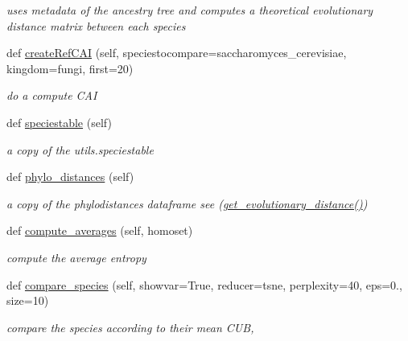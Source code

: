 \begin{DoxyCompactItemize}
\begin{DoxyCompactList}\small\item\em uses metadata of the ancestry tree and computes a theoretical evolutionary distance matrix between each species \end{DoxyCompactList}\item 
def \mbox{\hyperlink{class_py_c_u_b_1_1py_c_u_b_1_1_py_c_u_b_a40a742a1a05fc21c7bced2c75fb93fc6}{create\+Ref\+C\+AI}} (self, speciestocompare=\textquotesingle{}saccharomyces\+\_\+cerevisiae\textquotesingle{}, kingdom=\textquotesingle{}fungi\textquotesingle{}, first=20)
\begin{DoxyCompactList}\small\item\em do a compute C\+AI \end{DoxyCompactList}\item 
def \mbox{\hyperlink{class_py_c_u_b_1_1py_c_u_b_1_1_py_c_u_b_af3e280c265200f13946e4bdcb4cd9dd0}{speciestable}} (self)
\begin{DoxyCompactList}\small\item\em a copy of the utils.\+speciestable \end{DoxyCompactList}\item 
def \mbox{\hyperlink{class_py_c_u_b_1_1py_c_u_b_1_1_py_c_u_b_a2ea40ac1dd5b4ad8847ec12c867d457f}{phylo\+\_\+distances}} (self)
\begin{DoxyCompactList}\small\item\em a copy of the phylodistances dataframe see (\mbox{\hyperlink{class_py_c_u_b_1_1py_c_u_b_1_1_py_c_u_b_af0d7bed125f4437bea6b8051f9922c1d}{get\+\_\+evolutionary\+\_\+distance()}}) \end{DoxyCompactList}\item 
def \mbox{\hyperlink{class_py_c_u_b_1_1py_c_u_b_1_1_py_c_u_b_a9526c0d10381daf5abc8ea120454e701}{compute\+\_\+averages}} (self, homoset)
\begin{DoxyCompactList}\small\item\em compute the average entropy \end{DoxyCompactList}\item 
def \mbox{\hyperlink{class_py_c_u_b_1_1py_c_u_b_1_1_py_c_u_b_ad7f24b316bc8c257719da20c0792ec01}{compare\+\_\+species}} (self, showvar=True, reducer=\textquotesingle{}tsne\textquotesingle{}, perplexity=40, eps=0., size=10)
\begin{DoxyCompactList}\small\item\em compare the species according to their mean C\+UB, \end{DoxyCompactList}\item 

\end{DoxyCompactItemize}
